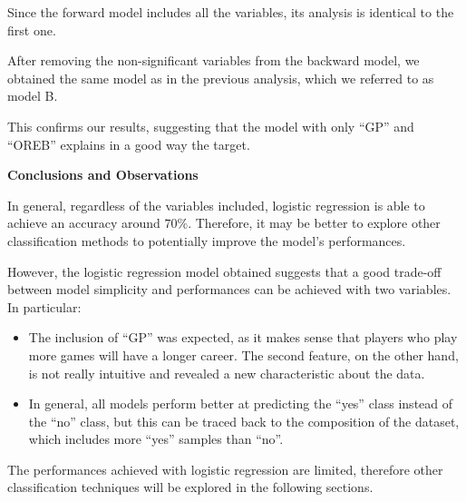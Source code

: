 Since the forward model includes all the variables, its analysis is identical to the first one.

After removing the non-significant variables from the backward model, we obtained the same model as in the previous analysis, which we referred to as model B. 

This confirms our results, suggesting that the model with only ``GP'' and ``OREB'' explains in a good way the target. 

\vspace{0.2cm}
\textbf{Conclusions and Observations}

In general, regardless of the variables included, logistic regression is able to achieve an accuracy around $70\%$. Therefore, it may be better to explore other classification methods to potentially improve the model's performances.

However, the logistic regression model obtained suggests that a good trade-off between model simplicity and performances can be achieved with two variables. In particular:

\begin{itemize}
	\item The inclusion of ``GP'' was expected, as it makes sense that players who play more games will have a longer career. The second feature, on the other hand, is not really intuitive and revealed a new characteristic about the data.
	\item In general, all models perform better at predicting the ``yes'' class instead of the ``no'' class, but this can be traced back to the composition of the dataset, which includes more ``yes'' samples than ``no''.
\end{itemize}

The performances achieved with logistic regression are limited, therefore other classification techniques will be explored in the following sections.
